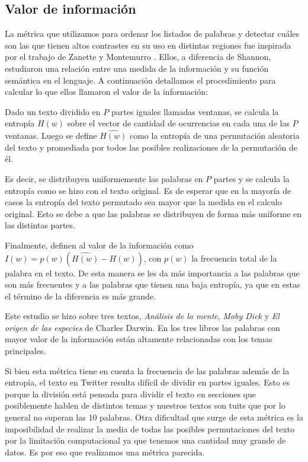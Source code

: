 \subsection{Valor de información}
La métrica que utilizamos para ordenar los listados de palabras y detectar cuáles son
las que tienen altos contrastes en su uso en distintas regiones fue inspirada por el
trabajo de Zanette y Montemurro \cite{montemurro2010towards}.
Ellos, a diferencia de Shannon, estudiaron una relación entre una medida de la información y su función semántica en el lenguaje.
A continuación detallamos el procedimiento para calcular lo que ellos llamaron
el valor de la información:

Dado un texto dividido en $P$ partes iguales llamadas ventanas, se calcula la entropía  $H(w)$ sobre el vector de cantidad de ocurrencias en cada una de las $P$ ventanas.
Luego se define $\widehat{H(w)}$  como la entropía de una permutación aleatoria del texto y promediada por todos las posibles realizaciones de la permutación de él. 

Es decir, se distribuyen uniformemente las palabras en $P$ partes y se calcula la
entropía como se hizo con el texto original. Es de esperar que en la mayoría de casos 
la entropía del texto permutado sea mayor que la medida en el calculo original. Esto 
se debe a que las palabras se distribuyen de forma más uniforme 
en las distintas partes.

Finalmente, definen al valor de la información como $I(w) = p(w) (\widehat{H(w)} - H(w))$, con $p(w)$ la frecuencia total de la palabra en el texto. 
De esta manera se les da más importancia a las palabras que son más frecuentes y a las palabras que tienen una baja entropía, ya que en estas el término de la diferencia es más grande.

Este estudio se hizo sobre tres textos, \textit{Análisis de la mente}, 
\textit{Moby Dick} y \textit{El origen de las especies} de Charles Darwin. 
En los tres libros las palabras con mayor valor de la información están 
altamente relacionadas con los temas principales.

Si bien esta métrica tiene en cuenta la frecuencia de las palabras además de la 
entropía, el texto en Twitter resulta difícil de dividir en partes iguales. 
Esto es porque la división está pensada para dividir el texto en secciones que 
posiblemente hablen de distintos temas y nuestros textos son tuits que por lo general no superan las 10 palabras.
Otra dificultad que surge de esta métrica es la imposibilidad de realizar la media 
de todas las posibles permutaciones del texto por la limitación computacional ya que 
tenemos una cantidad muy grande de datos. Es por eso que realizamos una métrica parecida.

